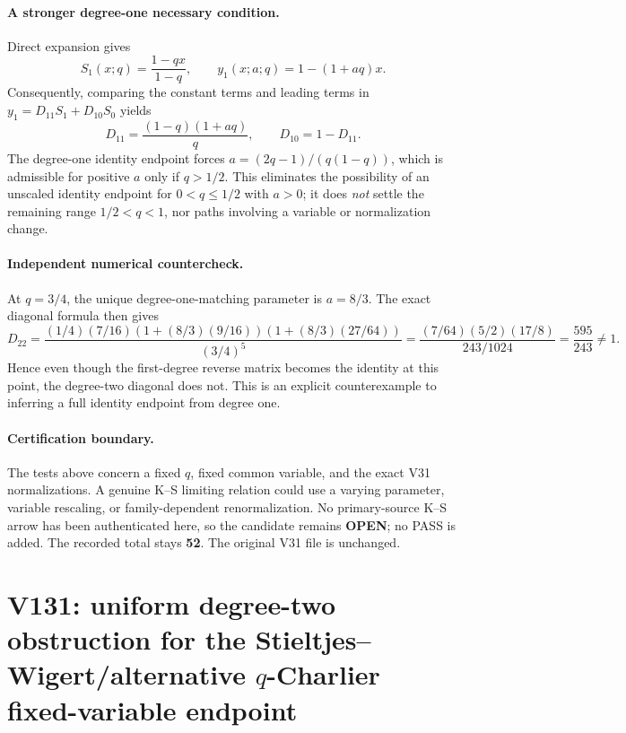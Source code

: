 \documentclass[11pt]{article}
\begin{document}
\paragraph{A stronger degree-one necessary condition.}
Direct expansion gives
\[
 S_1(x;q)=\frac{1-qx}{1-q},\qquad
 y_1(x;a;q)=1-(1+aq)x.
\]
Consequently, comparing the constant terms and leading terms in $y_1=D_{11}S_1+D_{10}S_0$ yields
\begin{equation}\label{eq:v130-degree-one}
 \boxed{D_{11}=\frac{(1-q)(1+aq)}q,\qquad D_{10}=1-D_{11}.}
\end{equation}
The degree-one identity endpoint forces $a=(2q-1)/(q(1-q))$, which is admissible for positive $a$ only if $q>1/2$. This eliminates the possibility of an unscaled identity endpoint for $0<q\le1/2$ with $a>0$; it does \emph{not} settle the remaining range $1/2<q<1$, nor paths involving a variable or normalization change.

\paragraph{Independent numerical countercheck.} At $q=3/4$, the unique degree-one-matching parameter is $a=8/3$. The exact diagonal formula then gives
\[
 D_{22}=\frac{(1/4)(7/16)(1+(8/3)(9/16))(1+(8/3)(27/64))}{(3/4)^5}
 =\frac{(7/64)(5/2)(17/8)}{243/1024}
 =\frac{595}{243}\ne1.
\]
Hence even though the first-degree reverse matrix becomes the identity at this point, the degree-two diagonal does not. This is an explicit counterexample to inferring a full identity endpoint from degree one.

\paragraph{Certification boundary.} The tests above concern a fixed $q$, fixed common variable, and the exact V31 normalizations. A genuine K--S limiting relation could use a varying parameter, variable rescaling, or family-dependent renormalization. No primary-source K--S arrow has been authenticated here, so the candidate remains \textbf{OPEN}; no PASS is added. The recorded total stays \textbf{52}. The original V31 file is unchanged.



\clearpage
\section{V131: uniform degree-two obstruction for the Stieltjes--Wigert/alternative $q$-Charlier fixed-variable endpoint}
\label{sec:v131-uniform-obstruction}
\end{document}
